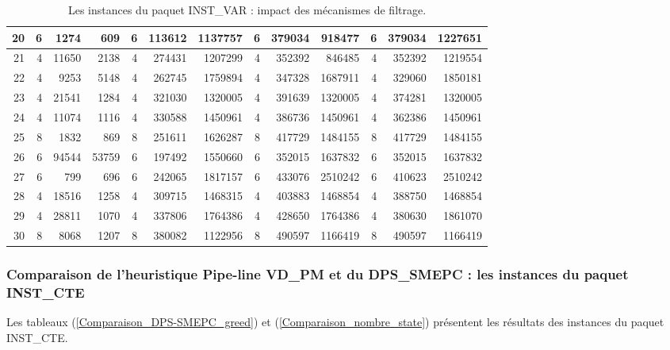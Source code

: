 \begin{table}[H]
\begin{tabular}{|r|rrr|rrr|rrr|rrr|}
	20	&	6	&	1274	&	609	&	6	&	113612	&	1137757	&	6	&	379034	&	918477	&	6	&	379034	&	1227651	\\ \hline
	21	&	4	&	11650	&	2138	&	4	&	274431	&	1207299	&	4	&	352392	&	846485	&	4	&	352392	&	1219554	\\ \hline
	22	&	4	&	9253	&	5148	&	4	&	262745	&	1759894	&	4	&	347328	&	1687911	&	4	&	329060	&	1850181	\\ \hline
	23	&	4	&	21541	&	1284	&	4	&	321030	&	1320005	&	4	&	391639	&	1320005	&	4	&	374281	&	1320005	\\ \hline
	24	&	4	&	11074	&	1116	&	4	&	330588	&	1450961	&	4	&	386736	&	1450961	&	4	&	362386	&	1450961	\\ \hline
	25	&	8	&	1832	&	869	&	8	&	251611	&	1626287	&	8	&	417729	&	1484155	&	8	&	417729	&	1484155	\\ \hline
	26	&	6	&	94544	&	53759	&	6	&	197492	&	1550660	&	6	&	352015	&	1637832	&	6	&	352015	&	1637832	\\ \hline
	27	&	6	&	799	&	696	&	6	&	242065	&	1817157	&	6	&	433076	&	2510242	&	6	&	410623	&	2510242	\\ \hline
	28	&	4	&	18516	&	1258	&	4	&	309715	&	1468315	&	4	&	403883	&	1468854	&	4	&	388750	&	1468854	\\ \hline
	29	&	4	&	28811	&	1070	&	4	&	337806	&	1764386	&	4	&	428650	&	1764386	&	4	&	380630	&	1861070	\\ \hline
	30	&	8	&	8068	&	1207	&	8	&	380082	&	1122956	&	8	&	490597	&	1166419	&	8	&	490597	&	1166419	\\ \hline
		
		\bottomrule
	\end{tabular}%
	\caption{Les instances du paquet INST\_VAR : impact des mécanismes de filtrage.}
	
	\label{Comparaison_nombre_state2}%
\end{table}%


\subsubsection{Comparaison de l'heuristique Pipe-line VD\_PM et du DPS\_SMEPC : les instances du paquet INST\_CTE}

Les tableaux (\ref{Comparaison_DPS-SMEPC_greed}) et (\ref{Comparaison_nombre_state}) présentent les résultats des instances du paquet INST\_CTE.%


